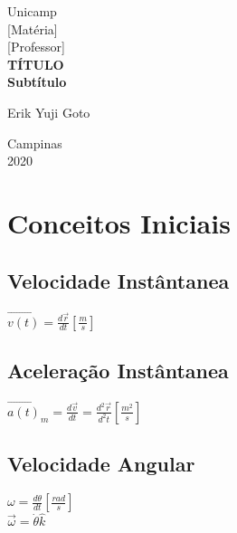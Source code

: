 \documentclass[a4paper, 12pt]{article}
\begin{document}
%
\begin{titlepage} %
	\begin{center} %
		{\large Unicamp}\\[0.2cm] %
		{\large [Matéria]}\\[0.2cm] %
		{\large [Professor]}\\[3.2cm]
		{\bf \huge TÍTULO}\\[0.2cm] 
		{\bf \large Subtítulo}\\[4.9cm]
	\end{center} %
	{\large Erik Yuji Goto}\\[10cm] %
	\begin{center}
	
		{\large Campinas}\\[0.2cm]
		{\large 2020}
	\end{center}
\end{titlepage} %


\tableofcontents
\newpage

\section{Conceitos Iniciais}
	\subsection{Velocidade Instântanea}
		\begin{center}
			\Large			
			$
			\vec{v(t)} = \frac{d\vec{r}}{dt}[\frac{m}{s}]			
			$
		\end{center}
	\subsection{Aceleração Instântanea}
		\begin{center}
			\Large			
			$
			\vec{a(t)}_m = \frac{d\vec{v}}{dt} = \frac{d^2\vec{r}}{d^2t} [\frac{m^2}{s}]			
			$
		\end{center}
	
	\subsection{Velocidade Angular}
		\begin{center}
			\Large			
			$
			\omega = \frac{d\theta}{dt} [\frac{rad}{s}]	
			$\\
			$
			\vec{\omega} = \dot{\theta}\hat{k}
			$			
			
		\end{center}
		
\end{document}
